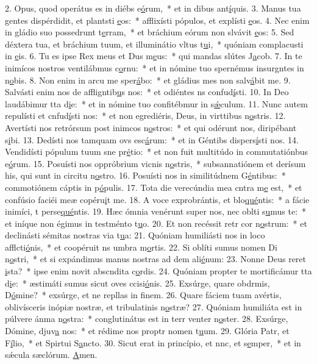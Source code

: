 2. Opus, quod operátus es in diébs e\uline{ó}rum,~* et in dibus ant\uline{í}quis.
3. Manus tua gentes dispérdidit, et plantsti \uline{e}os:~* afflixísti pópulos, et explísti \uline{e}os.
4. Nec enim in gládio suo possedrunt t\uline{e}rram,~* et bráchium eórum non slvávit \uline{e}os:
5. Sed déxtera tua, et bráchium tuum, et illuminátio vltus t\uline{u}i,~* quóniam complacusti in \uline{e}is.
6. Tu es ipse Rex meus et Dus m\uline{e}us:~* qui mandas slútes J\uline{a}cob.
7. In te inimícos nostros ventilábmus c\uline{o}rnu:~* et in nómine tuo spernémus insurgntes in n\uline{o}bis.
8. Non enim in arcu me sper\uline{á}bo:~* et gládius mes non salv\uline{á}bit me.
9. Salvásti enim nos de affligntib\uline{u}s nos:~* et odiéntes ns confud\uline{í}sti.
10. In Deo laudábimur tta d\uline{i}e:~* et in nómine tuo confitébmur in s\uline{ǽ}culum.
11. Nunc autem repulísti et cnfud\uline{í}sti nos:~* et non egrediéris, Deus, in virttibus n\uline{o}stris.
12. Avertísti nos retrórsum post inimcos n\uline{o}stros:~* et qui odérunt nos, diripébant s\uline{i}bi.
13. Dedísti nos tamquam ovs esc\uline{á}rum:~* et in Géntibs dispers\uline{í}sti nos.
14. Vendidísti pópulum tuum sne pr\uline{é}tio:~* et non fuit multitúdo in commutatiónbus e\uline{ó}rum.
15. Posuísti nos oppróbrium vicnis n\uline{o}stris,~* subsannatiónem et derísum his, qui sunt in circitu n\uline{o}stro.
16. Posuísti nos in similitúdnem G\uline{é}ntibus:~* commotiónem cáptis in p\uline{ó}pulis.
17. Tota die verecúndia mea cntra m\uline{e} est,~* et confúsio faciéi meæ copéru\uline{i}t me.
18. A voce exprobrántis, et blo\uline{qué}ntis:~* a fácie inimíci, t perse\uline{qué}ntis.
19. Hæc ómnia venérunt super nos, nec oblti s\uline{u}mus te:~* et iníque non égimus in testménto t\uline{u}o.
20. Et non recéssit retr cor n\uline{o}strum:~* et declinásti sémitas nostras  via t\uline{u}a:
21. Quóniam humiliásti nos in loco afflcti\uline{ó}nis,~* et coopéruit ns umbra m\uline{o}rtis.
22. Si oblíti sumus nomen Di n\uline{o}stri,~* et si expándimus manus nostras ad dem ali\uline{é}num:
23. Nonne Deus reret \uline{i}sta?~* ipse enim novit abscndita c\uline{o}rdis.
24. Quóniam propter te mortificámur tta d\uline{i}e:~* æstimáti sumus sicut oves ccisi\uline{ó}nis.
25. Exsúrge, quare obdrmis, D\uline{ó}mine?~* exsúrge, et ne repllas in f\uline{i}nem.
26. Quare fáciem tuam avértis, oblivísceris inópiæ nostræ, et tribulatinis n\uline{o}stræ?
27. Quóniam humiliáta est in púlvere ánma n\uline{o}stra:~* conglutinátus est in terr venter n\uline{o}ster.
28. Exsúrge, Dómine, djuv\uline{a} nos:~* et rédime nos proptr nomen t\uline{u}um.
29. Glória Patr, et F\uline{í}lio,~* et Spirtui S\uline{a}ncto.
30. Sicut erat in princípio, et nnc, et s\uline{e}mper,~* et in sǽcula sæclórum. \uline{A}men.
